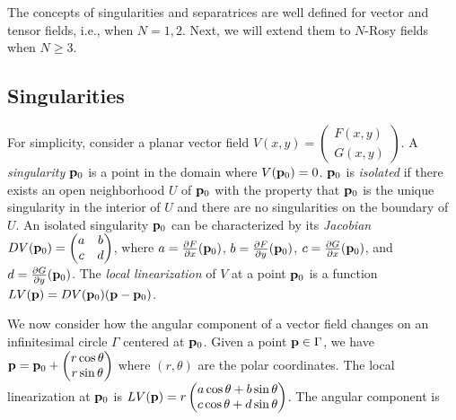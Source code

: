 \documentclass{acmsiggraph}               %
\begin{document}
The concepts of singularities and separatrices are well defined for
vector and tensor fields, i.e., when $N=1,2$. Next, we will extend
them to $N$-Rosy fields when $N \ge 3$.

\subsection{Singularities}
\label{sec:singularities}

For simplicity, consider a planar vector field $V(x, y) =
\begin{pmatrix} F(x, y) \\ G(x, y) \end{pmatrix}$. A {\em
singularity} ${\bf p}_0$ is a point in the domain where $V({\bf
p}_0)=0$. ${\bf p}_0$ is {\em isolated} if there exists an open
neighborhood $U$ of ${\bf p}_0$ with the property that ${\bf p}_0$
is the unique singularity in the interior of $U$ and there are no
singularities on the boundary of $U$. An isolated singularity ${\bf
p}_0$ can be characterized by its {\em Jacobian} $DV({\bf p}_0) =
\begin{pmatrix} a & b \\ c & d \end{pmatrix}$, where $a=\frac{\partial F}{\partial x}({\bf p}_0)$,
$b=\frac{\partial F}{\partial y}({\bf p}_0)$, $c=\frac{\partial
G}{\partial x}({\bf p}_0)$, and $d=\frac{\partial G}{\partial
y}({\bf p}_0)$. The {\em local linearization} of $V$ at a point
${\bf p}_0$ is a function $LV({\bf p}) = DV({\bf p}_0)({\bf p}-{\bf
p}_0)$.


We now consider how the angular component of a vector field changes
on an infinitesimal circle $\Gamma$ centered at ${\bf p}_0$. Given a
point ${\bf p} \in \Gamma$, we have ${\bf p} = {\bf p}_0 +
\begin{pmatrix} r\cos\theta \\ r\sin\theta \end{pmatrix}$
where $(r, \theta)$ are the polar coordinates. The local
linearization at ${\bf p}_0$ is
$LV({\bf p}) = r\begin{pmatrix} a\cos\theta+b\sin\theta \\
c\cos\theta+d\sin\theta
\end{pmatrix}$. The angular component is
\end{document}
